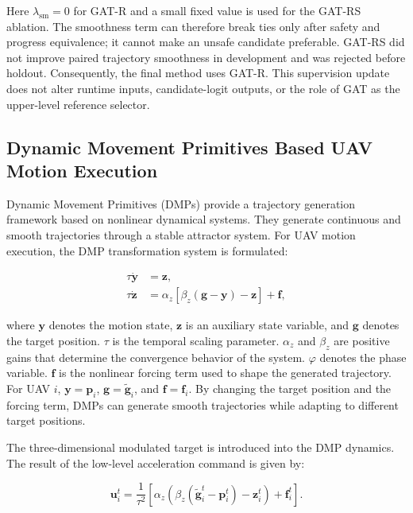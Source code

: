 \noindent
Here $\lambda_{\mathrm{sm}}=0$ for GAT-R and a small fixed value is used for the GAT-RS ablation. The smoothness term can therefore break ties only after safety and progress equivalence; it cannot make an unsafe candidate preferable. GAT-RS did not improve paired trajectory smoothness in development and was rejected before holdout. Consequently, the final method uses GAT-R. This supervision update does not alter runtime inputs, candidate-logit outputs, or the role of GAT as the upper-level reference selector.

\subsection{Dynamic Movement Primitives Based UAV Motion Execution}

Dynamic Movement Primitives (DMPs) provide a trajectory generation framework based on nonlinear dynamical systems. They generate continuous and smooth trajectories through a stable attractor system. For UAV motion execution, the DMP transformation system is formulated:

\begin{equation}
    \label{eq:dmp_system}
    \begin{aligned}
        \tau \dot{\mathbf y}
        &=
        \mathbf z,\\
        \tau \dot{\mathbf z}
        &=
        \alpha_z
        \left[
        \beta_z(\mathbf g-\mathbf y)-\mathbf z
        \right]
        +
        \mathbf f,
    \end{aligned}
\end{equation}

\noindent
where $\mathbf y$ denotes the motion state, $\mathbf z$ is an auxiliary state variable, and $\mathbf g$ denotes the target position. $\tau$ is the temporal scaling parameter. $\alpha_z$ and $\beta_z$ are positive gains that determine the convergence behavior of the system.
$\varphi$ denotes the phase variable. $\mathbf f$ is the nonlinear forcing term used to shape the generated trajectory. For UAV $i$, $\mathbf y=\mathbf p_i$, $\mathbf g=\widetilde{\mathbf g}_i$, and $\mathbf f=\mathbf f_i$. By changing the target position and the forcing term, DMPs can generate smooth trajectories while adapting to different target positions.

The three-dimensional modulated target is introduced into the DMP dynamics. The result of the low-level acceleration command is given by:

\begin{equation}
    \label{eq:dmp_acceleration}
    \mathbf u_{i}^{t}
    =
    \frac{1}{\tau^2}
    \left[
    \alpha_z
    \left(
    \beta_z
    \left(
    \widetilde{\mathbf g}_{i}^{t}
    -
    \mathbf p_{i}^{t}
    \right)
    -
    \mathbf z_{i}^{t}
    \right)
    +
    \mathbf f_i^t
    \right].
\end{equation}

